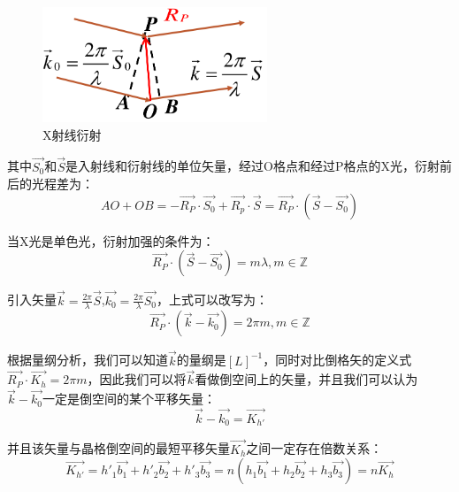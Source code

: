 \documentclass{ctexart}
\begin{document}
        \begin{figure}[H]
            \centering
            \includegraphics[width=0.6\textwidth]{figure/晶体衍射.png}
            \caption{X射线衍射}
            \label{fig:crystaldiffraction}
        \end{figure}
        
        其中$\vec{S_0}$和$\vec{S}$是入射线和衍射线的单位矢量，经过O格点和经过P格点的X光，衍射前后的光程差为：
        \begin{equation}
            AO+OB=-\vec{R_P}\cdot \vec{S_0}+\vec{R_p}\cdot \vec{S}=\vec{R_P}\cdot(\vec{S}-\vec{S_0})
        \end{equation}
        
        当X光是单色光，衍射加强的条件为：
        \begin{equation}
            \vec{R_P}\cdot(\vec{S}-\vec{S_0})=m\lambda,m\in\mathbb{Z}
        \end{equation}
        
        引入矢量$\vec{k}=\frac{2\pi}{\lambda}\vec{S}$,$\vec{k_0}=\frac{2\pi}{\lambda}\vec{S_0}$，上式可以改写为：
        \begin{equation}
            \vec{R_P}\cdot(\vec{k}-\vec{k_0})=2\pi m,m\in\mathbb{Z}
        \end{equation}
        
        根据量纲分析，我们可以知道$\vec{k}$的量纲是$[L]^{-1}$，同时对比倒格矢的定义式$\vec{R_P}\cdot\vec{K_h}=2\pi m$，因此我们可以将$\vec{k}$看做倒空间上的矢量，并且我们可以认为$\vec{k}-\vec{k_0}$一定是倒空间的某个平移矢量：
        \begin{equation}
            \vec{k}-\vec{k_0}=\vec{K_{h'}}
        \end{equation}
        
        并且该矢量与晶格倒空间的最短平移矢量$\vec{K_h}$之间一定存在倍数关系：
        \begin{equation}
            \vec{K_{h'}}=h'_1\vec{b_1}+h'_2\vec{b_2}+h'_3\vec{b_3}=n(h_1\vec{b_1}+h_2\vec{b_2}+h_3\vec{b_3})=n\vec{K_h}
        \end{equation}
        
\end{document}
